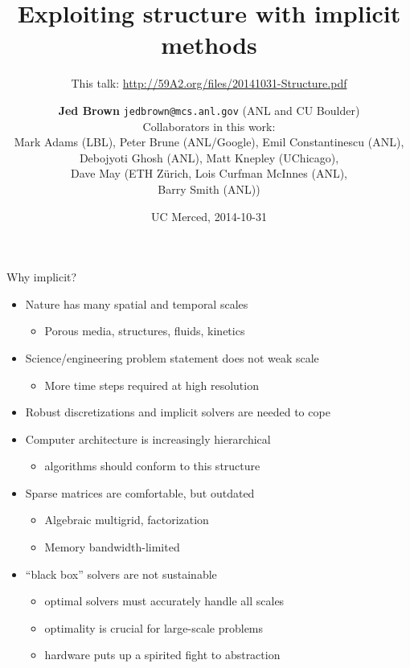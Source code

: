 \documentclass{beamer}
\title{Exploiting structure with implicit methods}
\subtitle{This talk: \url{http://59A2.org/files/20141031-Structure.pdf}}
\author{{\bf Jed Brown} \texttt{jedbrown@mcs.anl.gov} (ANL and CU Boulder) \\
  Collaborators in this work: \\
  \quad Mark Adams (LBL), Peter Brune (ANL/Google), Emil Constantinescu (ANL), \\
Debojyoti Ghosh (ANL), Matt Knepley (UChicago),  \\
Dave May (ETH Z\"urich, Lois Curfman McInnes (ANL), \\
Barry Smith (ANL))
}
\date{UC Merced, 2014-10-31}
\begin{document}
\lstset{language=C}
\normalem

\begin{frame}
  \titlepage
\end{frame}

\begin{frame}{Why implicit?}
  \begin{itemize}
  \item Nature has many spatial and temporal scales
    \begin{itemize}
    \item Porous media, structures, fluids, kinetics
    \end{itemize}
  \item Science/engineering problem statement does not weak scale
    \begin{itemize}
    \item More time steps required at high resolution
    \end{itemize}
  \item Robust discretizations and implicit solvers are needed to cope
  \item Computer architecture is increasingly hierarchical
    \begin{itemize}
    \item algorithms should conform to this structure
    \end{itemize}
  \item Sparse matrices are comfortable, but outdated
    \begin{itemize}
    \item Algebraic multigrid, factorization
    \item Memory bandwidth-limited
    \end{itemize}
  \item ``black box'' solvers are not sustainable
    \begin{itemize}
    \item optimal solvers must accurately handle all scales
    \item optimality is crucial for large-scale problems
    \item hardware puts up a spirited fight to abstraction
    \end{itemize}
  \end{itemize}
\end{frame}







\end{document}
